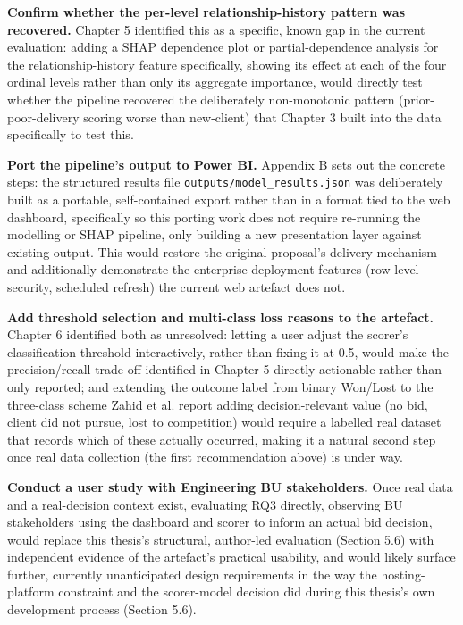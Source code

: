 \documentclass[12pt,oneside]{report}
\begin{document}
\textbf{Confirm whether the per-level relationship-history pattern was
recovered.} Chapter 5 identified this as a specific, known gap in the
current evaluation: adding a SHAP dependence plot or partial-dependence
analysis for the relationship-history feature specifically, showing its
effect at each of the four ordinal levels rather than only its aggregate
importance, would directly test whether the pipeline recovered the
deliberately non-monotonic pattern (prior-poor-delivery scoring worse
than new-client) that Chapter 3 built into the data specifically to test
this.

\textbf{Port the pipeline's output to Power BI.} Appendix B sets out the
concrete steps: the structured results file
\texttt{outputs/model\_results.json} was deliberately built as a
portable, self-contained export rather than in a format tied to the web
dashboard, specifically so this porting work does not require re-running
the modelling or SHAP pipeline, only building a new presentation layer
against existing output. This would restore the original proposal's
delivery mechanism and additionally demonstrate the enterprise
deployment features (row-level security, scheduled refresh) the current
web artefact does not.

\textbf{Add threshold selection and multi-class loss reasons to the
artefact.} Chapter 6 identified both as unresolved: letting a user
adjust the scorer's classification threshold interactively, rather than
fixing it at 0.5, would make the precision/recall trade-off identified
in Chapter 5 directly actionable rather than only reported; and
extending the outcome label from binary Won/Lost to the three-class
scheme Zahid et al. \citeyearpar{zahid2021predicting} report adding
decision-relevant value (no bid, client did not pursue, lost to
competition) would require a labelled real dataset that records which of
these actually occurred, making it a natural second step once real data
collection (the first recommendation above) is under way.

\textbf{Conduct a user study with Engineering BU stakeholders.} Once
real data and a real-decision context exist, evaluating RQ3 directly,
observing BU stakeholders using the dashboard and scorer to inform an
actual bid decision, would replace this thesis's structural, author-led
evaluation (Section 5.6) with independent evidence of the artefact's
practical usability, and would likely surface further, currently
unanticipated design requirements in the way the hosting-platform
constraint and the scorer-model decision did during this thesis's own
development process (Section 5.6).
\end{document}
